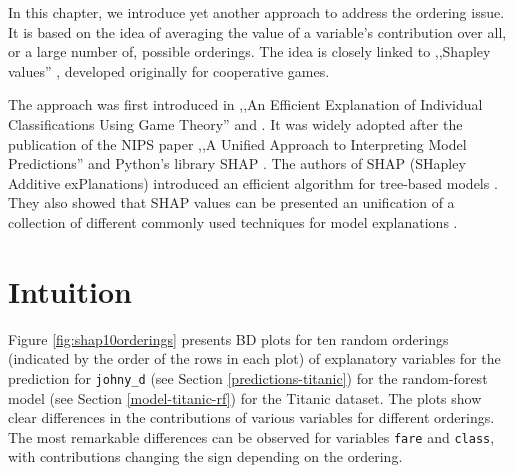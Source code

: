 \documentclass[]{krantz}
\begin{document}
In this chapter, we introduce yet another approach to address the ordering issue. It is based on the idea of averaging the value of a variable's contribution over all, or a large number of, possible orderings. The idea is closely linked to ,,Shapley values'' \citep{shapleybook1952}, developed originally for cooperative games.

The approach was first introduced in ,,An Efficient Explanation of Individual Classifications Using Game Theory'' \citep{imeJLMR} and \citep{Strumbelj2014}. It was widely adopted after the publication of the NIPS paper ,,A Unified Approach to Interpreting Model Predictions'' \citep{SHAP} and Python's library SHAP \citep{shapPackage}. The authors of SHAP (SHapley Additive exPlanations) introduced an efficient algorithm for tree-based models \citep{TreeSHAP}. They also showed that SHAP values can be presented an unification of a collection of different commonly used techniques for model explanations \citep{SHAP}.

\hypertarget{SHAPIntuition}{%
\section{Intuition}\label{SHAPIntuition}}

Figure \ref{fig:shap10orderings} presents BD plots for ten random orderings (indicated by the order of the rows in each plot) of explanatory variables for the prediction for \texttt{johny\_d} (see Section \ref{predictions-titanic}) for the random-forest model (see Section \ref{model-titanic-rf}) for the Titanic dataset. The plots show clear differences in the contributions of various variables for different orderings. The most remarkable differences can be observed for variables \texttt{fare} and \texttt{class}, with contributions changing the sign depending on the ordering.
\end{document}
